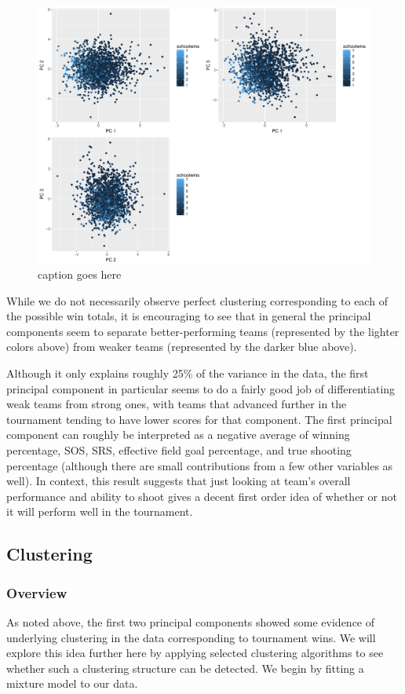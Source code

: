 \documentclass[10pt,a4paper, hidelinks]{article} %
\begin{document}
\begin{figure}[H]
	\centering
	\includegraphics[width=0.7\linewidth]{../fig/PrinComps}
	\caption{caption goes here}
	\label{fig:princomps}
\end{figure}


While we do not necessarily observe perfect clustering corresponding to each of the possible win totals, it is encouraging to see that in general the principal components seem to separate better-performing teams (represented by the lighter colors above) from weaker teams (represented by the darker blue above). 

Although it only explains roughly 25\% of the variance in the data, the first principal component in particular seems to do a fairly good job of differentiating weak teams from strong ones, with teams that advanced further in the tournament tending to have lower scores for that component. The first principal component can roughly be interpreted as a negative average of winning percentage, SOS, SRS, effective field goal percentage, and true shooting percentage (although there are small contributions from a few other variables as well). In context, this result suggests that just looking at team's overall performance and ability to shoot gives a decent first order idea of whether or not it will perform well in the tournament.

\subsection{Clustering}
\subsubsection{Overview}
As noted above, the first two principal components showed some evidence of underlying clustering in the data corresponding to tournament wins. We will explore this idea further here by applying selected clustering algorithms to see whether such a clustering structure can be detected. We begin by fitting a mixture model to our data.
\end{document}
